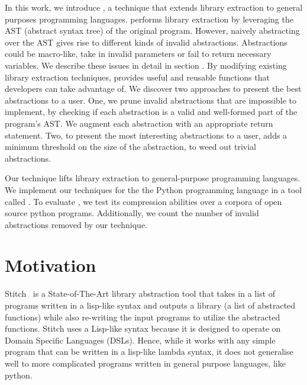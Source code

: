 In this work, we introduce \toolname, a technique that extends library extraction to general purposes programming languages. \toolname performs library extraction by leveraging the AST (abstract syntax tree) of the original program. However, naively abstracting over the AST gives rise to different kinds of invalid abstractions. Abstractions could be macro-like, take in invalid parameters or fail to return necessary variables. We describe these issues in detail in section .  
By modifying existing library extraction techniques, \toolname provides useful and reusable functions that developers can take advantage of. We discover two approaches to present the best abstractions to a user. One, we prune invalid abstractions that are impossible to implement, by checking if each abstraction is a valid and well-formed part of the program's AST. We augment each abstraction with an appropriate return statement.
Two, to present the most interesting abstractions to a user, \toolname adds a minimum threshold on the size of the abstraction, to weed out trivial abstractions. 

Our technique lifts library extraction to general-purpose programming languages. We implement our techniques for the the Python programming language in a tool called \toolname.
To evaluate \toolname, we test its compression abilities over a corpora of open source python programs. Additionally, we count the number of invalid abstractions removed by our technique.





\section{Motivation}

Stitch~\cite{Bowers_2023stitch} is a State-of-The-Art library abstraction tool that takes in a list of programs written in a lisp-like syntax and outputs a library (a list of abstracted functions) while also re-writing the input programs to utilize the abstracted functions. Stitch uses a Lisp-like syntax because it is designed to operate on Domain Specific Languages (DSLs). Hence, while it works with any simple program that can be written in a lisp-like lambda syntax, it does not generalise well to more complicated programs written in general purpose languages, like python.

